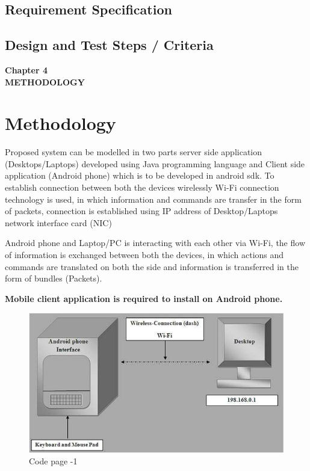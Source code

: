 \documentclass[12pt]{article}
\begin{document}
 \subsection{Requirement Specification }
 \subsection{Design and Test Steps / Criteria}

\clearpage

\begin{center}
 \LARGE \textbf {Chapter 4 }\\[10mm]
 \Large \textbf{METHODOLOGY }\\[10mm]
 \end{center}
 \section{Methodology }
Proposed system can be modelled in two parts server side application
(Desktops/Laptops) developed using Java programming language and Client side
application (Android phone) which is to be developed in android sdk. To establish
connection between both the devices wirelessly Wi-Fi connection technology is
used, in which information and commands are transfer in the form of packets,
connection is established using IP address of Desktop/Laptops network interface
card (NIC)\par
Android phone and Laptop/PC is interacting with each other via Wi-Fi, the flow of
information is exchanged between both the devices, in which actions and
commands are translated on both the side and information is transferred in the
form of bundles (Packets).\\[5mm]\par
\textbf{Mobile client application is required to install on Android phone.}
 
 \begin{figure}[h]
 \centering
 \includegraphics[scale=.6]{Methodology}
  \caption{Code page -1 }
 \end{figure}
 
\end{document}

